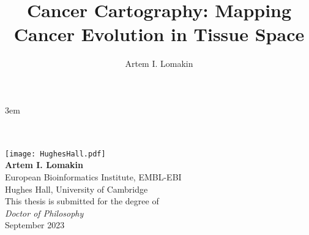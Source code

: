 \documentclass[a4paper,english, twoside, titlepage, DIV=8, BCOR=8.5mm, open=right, chapterprefix=false]{scrbook}
\title{Cancer Cartography: Mapping Cancer Evolution in Tissue Space}
\author{Artem I. Lomakin}
\begin{document}
\emergencystretch 3em %

\begin{titlepage}
    \centering
    \noindent{}\\[0.35cm]
    \noindent{}\\[2cm]
    
    \texttt{[image: HughesHall.pdf]}\\[2cm]

    \textbf{\LARGE Artem I. Lomakin}\\[0.4cm]
    {\Large European Bioinformatics Institute, EMBL-EBI}\\[0.2cm]
    {\Large Hughes Hall, University of Cambridge}\\[1.5cm]
    
    {\Large This thesis is submitted for the degree of}\\[0.2cm]
    \textit{\Large Doctor of Philosophy}\\[2cm]
    
    {\Large September 2023}
\end{titlepage}

\frontmatter



\tableofcontents
\listoffigs
\listofabbrev

\mainmatter







\appendix







\listofreferences
\end{document}
